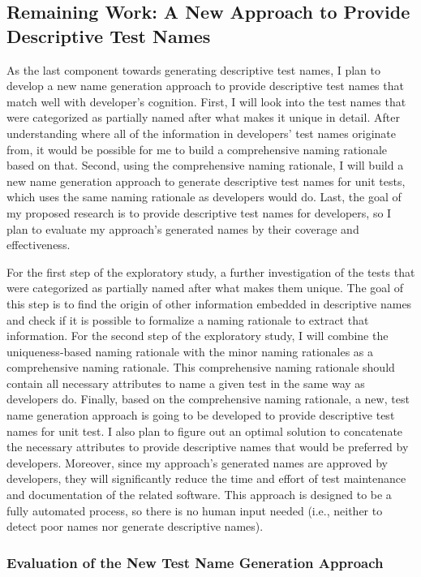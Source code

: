 \subsection{Remaining Work: A New Approach to Provide Descriptive Test Names}
\label{sec:remaining-work}

As the last component towards generating descriptive test names, I plan to develop a new name generation approach to provide descriptive test names that match well with developer's cognition.
%
First, I will look into the test names that were categorized as partially named after what makes it unique in detail.
%
After understanding where all of the information in developers' test names originate from, it would be possible for me to build a comprehensive naming rationale based on that.
%
Second, using the comprehensive naming rationale, I will build a new name generation approach to generate descriptive test names for unit tests, which uses the same naming rationale as developers would do.
%
Last, the goal of my proposed research is to provide descriptive test names for developers, so I plan to evaluate my approach's generated names by their coverage and effectiveness.


For the first step of the exploratory study, a further investigation of the tests that were categorized as partially named after what makes them unique.
%
The goal of this step is to find the origin of other information embedded in descriptive names and check if it is possible to formalize a naming rationale to extract that information.
%
For the second step of the exploratory study, I will combine the uniqueness-based naming rationale with the minor naming rationales as a comprehensive naming rationale.
%
This comprehensive naming rationale should contain all necessary attributes to name a given test in the same way as developers do.
%
Finally, based on the comprehensive naming rationale, a new, test name generation approach is going to be developed to provide descriptive test names for unit test.
%
I also plan to figure out an optimal solution to concatenate the necessary attributes to provide descriptive names that would be preferred by developers.
%
Moreover, since my approach's generated names are approved by developers, they will significantly reduce the time and effort of test maintenance and documentation of the related software.
%
This approach is designed to be a fully automated process, so there is no human input needed (i.e., neither to detect poor names nor generate descriptive names).


\subsubsection{Evaluation of the New Test Name Generation Approach}

